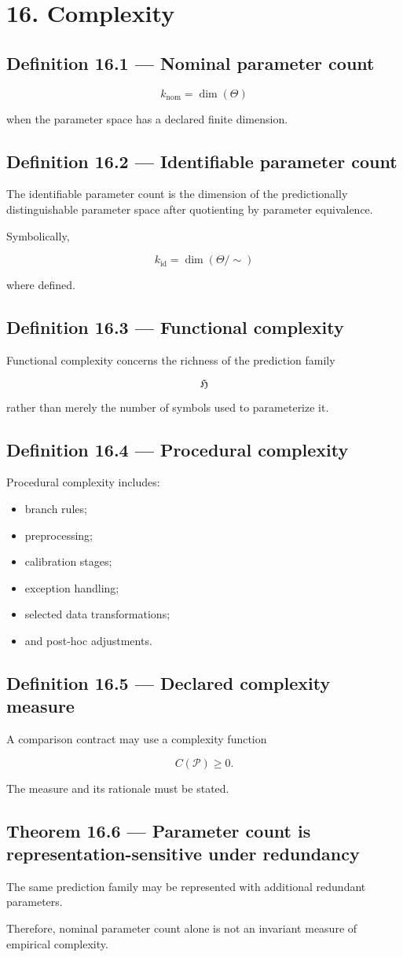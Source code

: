 \documentclass[11pt,oneside,openany]{book}
\newcommand{\PCsection}[1]{%
  \section*{#1}\addcontentsline{toc}{section}{#1}%
}
\newcommand{\PCsubsection}[1]{%
  \subsection*{#1}%
}
\begin{document}
\PCsection{16. Complexity}

\PCsubsection{Definition 16.1 --- Nominal parameter count}

\[
\boxed{ k_{\mathrm{nom}} = \dim(\Theta) }
\]

when the parameter space has a declared finite dimension.

\PCsubsection{Definition 16.2 --- Identifiable parameter count}

The identifiable parameter count is the dimension of the predictionally distinguishable parameter space after quotienting by parameter equivalence.

Symbolically,

\[
\boxed{ k_{\mathrm{id}} = \dim(\Theta/\!\sim) }
\]

where defined.

\PCsubsection{Definition 16.3 --- Functional complexity}

Functional complexity concerns the richness of the prediction family

\[
\mathfrak H
\]

rather than merely the number of symbols used to parameterize it.

\PCsubsection{Definition 16.4 --- Procedural complexity}

Procedural complexity includes:

\begin{itemize}
\item branch rules;
\item preprocessing;
\item calibration stages;
\item exception handling;
\item selected data transformations;
\item and post-hoc adjustments.
\end{itemize}
\PCsubsection{Definition 16.5 --- Declared complexity measure}

A comparison contract may use a complexity function

\[
\boxed{ C(\mathcal P)\geq0. }
\]

The measure and its rationale must be stated.

\PCsubsection{Theorem 16.6 --- Parameter count is representation-sensitive under redundancy}

The same prediction family may be represented with additional redundant parameters.

Therefore, nominal parameter count alone is not an invariant measure of empirical complexity.
\end{document}
